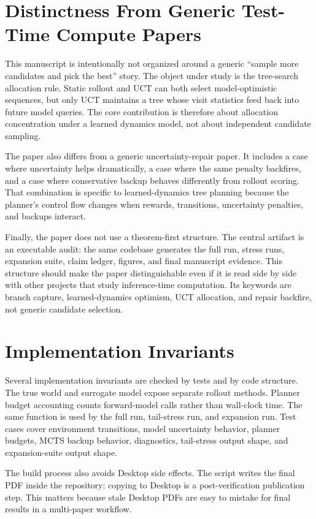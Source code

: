 \documentclass{article}
\begin{document}
\section{Distinctness From Generic Test-Time Compute Papers}

This manuscript is intentionally not organized around a generic ``sample more candidates and pick the best'' story. The object under study is the tree-search allocation rule. Static rollout and UCT can both select model-optimistic sequences, but only UCT maintains a tree whose visit statistics feed back into future model queries. The core contribution is therefore about allocation concentration under a learned dynamics model, not about independent candidate sampling.

The paper also differs from a generic uncertainty-repair paper. It includes a case where uncertainty helps dramatically, a case where the same penalty backfires, and a case where conservative backup behaves differently from rollout scoring. That combination is specific to learned-dynamics tree planning because the planner's control flow changes when rewards, transitions, uncertainty penalties, and backups interact.

Finally, the paper does not use a theorem-first structure. The central artifact is an executable audit: the same codebase generates the full run, stress runs, expansion suite, claim ledger, figures, and final manuscript evidence. This structure should make the paper distinguishable even if it is read side by side with other projects that study inference-time computation. Its keywords are branch capture, learned-dynamics optimism, UCT allocation, and repair backfire, not generic candidate selection.

\section{Implementation Invariants}

Several implementation invariants are checked by tests and by code structure. The true world and surrogate model expose separate rollout methods. Planner budget accounting counts forward-model calls rather than wall-clock time. The same  function is used by the full run, tail-stress run, and expansion run. Test cases cover environment transitions, model uncertainty behavior, planner budgets, MCTS backup behavior, diagnostics, tail-stress output shape, and expansion-suite output shape.

The build process also avoids Desktop side effects. The script writes the final PDF inside the repository; copying to Desktop is a post-verification publication step. This matters because stale Desktop PDFs are easy to mistake for final results in a multi-paper workflow.
\end{document}
